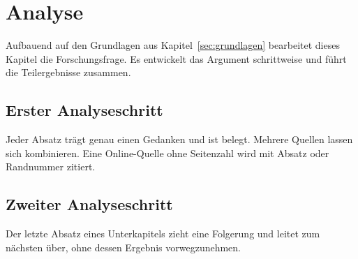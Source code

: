 \section{Analyse}
\label{sec:hauptteil}

Aufbauend auf den Grundlagen aus Kapitel~\ref{sec:grundlagen} bearbeitet dieses
Kapitel die Forschungsfrage. Es entwickelt das Argument schrittweise und führt
die Teilergebnisse zusammen.

\subsection{Erster Analyseschritt}
\label{subsec:analyse1}

Jeder Absatz trägt genau einen Gedanken und ist belegt. Mehrere Quellen lassen
sich kombinieren.\autocite[Vgl.][S.~22]{mustermann2024}\autocite[Vgl.][S.~5]{musterinstitut2023}
Eine Online-Quelle ohne Seitenzahl wird mit Absatz oder Randnummer
zitiert.\autocite[Vgl.][o.\,S.]{musterbehoerde2025}

\subsection{Zweiter Analyseschritt}
\label{subsec:analyse2}

Der letzte Absatz eines Unterkapitels zieht eine Folgerung und leitet zum
nächsten über, ohne dessen Ergebnis vorwegzunehmen.
